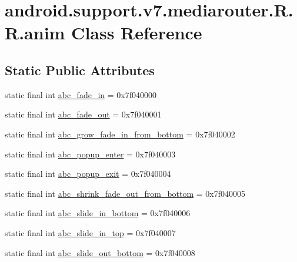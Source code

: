 \hypertarget{classandroid_1_1support_1_1v7_1_1mediarouter_1_1_r_1_1anim}{
\section{android.support.v7.mediarouter.R.R.anim Class Reference}
\label{classandroid_1_1support_1_1v7_1_1mediarouter_1_1_r_1_1anim}
}
\subsection*{Static Public Attributes}
\begin{CompactItemize}
\item 
static final int \hyperlink{classandroid_1_1support_1_1v7_1_1mediarouter_1_1_r_1_1anim_500904d737221f2e3ec179fef874bb48}{abc\_\-fade\_\-in} = 0x7f040000
\item 
static final int \hyperlink{classandroid_1_1support_1_1v7_1_1mediarouter_1_1_r_1_1anim_606e82fe6c3467a5c2abc784cb583bda}{abc\_\-fade\_\-out} = 0x7f040001
\item 
static final int \hyperlink{classandroid_1_1support_1_1v7_1_1mediarouter_1_1_r_1_1anim_16e05f9fc1eae2795eaa2f286f3b4c17}{abc\_\-grow\_\-fade\_\-in\_\-from\_\-bottom} = 0x7f040002
\item 
static final int \hyperlink{classandroid_1_1support_1_1v7_1_1mediarouter_1_1_r_1_1anim_52eaa6ae561e5feba6860cfd41d8238f}{abc\_\-popup\_\-enter} = 0x7f040003
\item 
static final int \hyperlink{classandroid_1_1support_1_1v7_1_1mediarouter_1_1_r_1_1anim_39daaead919bade49e2cab8d1a81eb52}{abc\_\-popup\_\-exit} = 0x7f040004
\item 
static final int \hyperlink{classandroid_1_1support_1_1v7_1_1mediarouter_1_1_r_1_1anim_decfb2f8ec226da657b9f56d01350868}{abc\_\-shrink\_\-fade\_\-out\_\-from\_\-bottom} = 0x7f040005
\item 
static final int \hyperlink{classandroid_1_1support_1_1v7_1_1mediarouter_1_1_r_1_1anim_5ef3592eee804f7c0a10ba784c3ad7a8}{abc\_\-slide\_\-in\_\-bottom} = 0x7f040006
\item 
static final int \hyperlink{classandroid_1_1support_1_1v7_1_1mediarouter_1_1_r_1_1anim_a8e5b5b863e253ac170c351bd6d04b1f}{abc\_\-slide\_\-in\_\-top} = 0x7f040007
\item 
static final int \hyperlink{classandroid_1_1support_1_1v7_1_1mediarouter_1_1_r_1_1anim_9919125586034892adc6c05403435660}{abc\_\-slide\_\-out\_\-bottom} = 0x7f040008

\end{CompactItemize}

